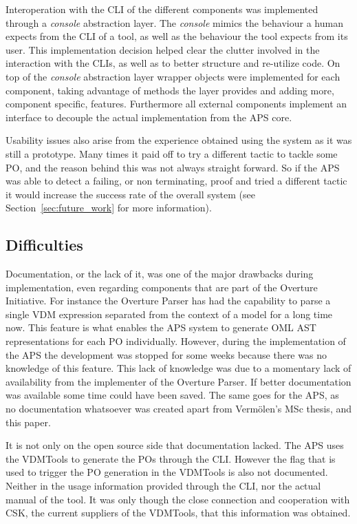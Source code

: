 \documentclass[]{article}
\begin{document}
Interoperation with the CLI of the different components was implemented through a \emph{console} abstraction layer.
The \emph{console} mimics the behaviour a human expects from the CLI of a tool, as well as the behaviour the tool expects from its user.
This implementation decision helped clear the clutter involved in the interaction with the CLIs, as well as to better structure and re-utilize code.
On top of the \emph{console} abstraction layer wrapper objects were implemented for each component, taking advantage of methods the layer provides and adding more, component specific, features.
Furthermore all external components implement an interface to decouple the actual implementation from the APS core.

Usability issues also arise from the experience obtained using the system as it was still a prototype.
Many times it paid off to try a different tactic to tackle some PO, and the reason behind this was not always straight forward.
So if the APS was able to detect a failing, or non terminating, proof and tried a different tactic it would increase the success rate of the overall system (see Section~\ref{sec:future_work} for more information).

\subsection{Difficulties}
\label{sub:implementation_difficulties}

Documentation, or the lack of it, was one of the major drawbacks during implementation, even regarding components that are part of the Overture Initiative.
For instance the Overture Parser has had the capability to parse a single VDM expression separated from the context of a model for a long time now.
This feature is what enables the APS system to generate OML AST representations for each PO individually.
However, during the implementation of the APS the development was stopped for some weeks because there was no knowledge of this feature.
This lack of knowledge was due to a momentary lack of availability from the implementer of the Overture Parser.
If better documentation was available some time could have been saved. 
The same goes for the APS, as no documentation whatsoever was created apart from Verm\"olen's MSc thesis, and this paper.

It is not only on the open source side that documentation lacked. 
The APS uses the VDMTools to generate the POs through the CLI.
However the flag that is used to trigger the PO generation in the VDMTools is also not documented.
Neither in the usage information provided through the CLI, nor the actual manual of the tool.
It was only though the close connection and cooperation with CSK, the current suppliers of the VDMTools, that this information was obtained.
\end{document}
